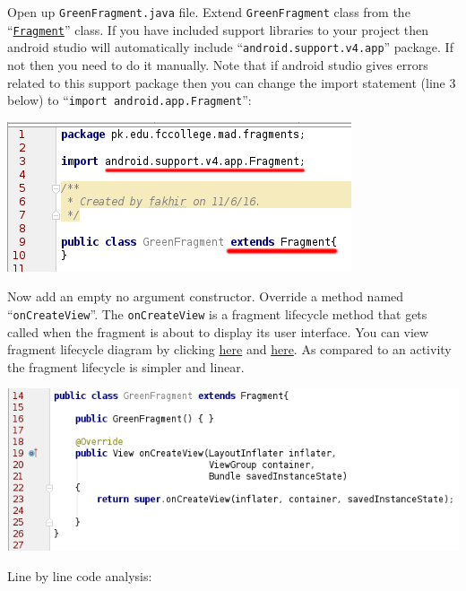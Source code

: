 Open up \texttt{GreenFragment.java} file. Extend \texttt{GreenFragment} class from the ``\href{https://developer.android.com/guide/components/fragments.html}{\texttt{Fragment}}'' class. If you have included support libraries to your project then android studio will automatically include ``\texttt{android.support.v4.app}'' package. If not then you need to do it manually. Note that if android studio gives errors related to this support package then you can change the import statement (line 3 below) to ``\texttt{import android.app.Fragment}'':

\begin{center}
	\includegraphics[scale=\SourceCodeScale]{chapters/ch11/images/5}
\end{center}

Now add an empty no argument constructor. Override a method named ``\texttt{onCreateView}''. The \texttt{onCreateView} is a fragment lifecycle method that gets called when the fragment is about to display its user interface. You can view fragment lifecycle diagram by clicking \href{https://developer.android.com/guide/components/fragments.html#Lifecycle}{here} and \href{https://developer.android.com/images/fragment_lifecycle.png}{here}. As compared to an activity the fragment lifecycle is simpler and linear.

\begin{center}
	\includegraphics[scale=\SourceCodeScale]{chapters/ch11/images/6}
\end{center}

Line by line code analysis:


